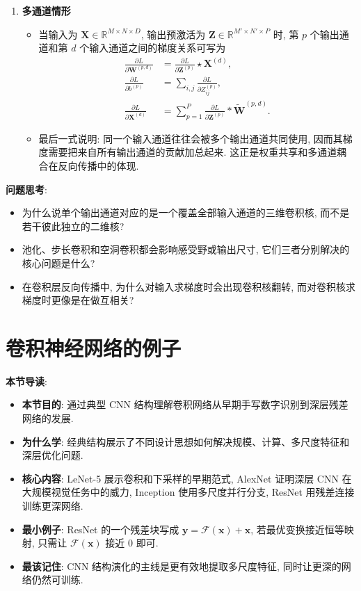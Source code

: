 \documentclass{../nndlcourse}
\begin{document}
\begin{enumerate}
    \item \textbf{多通道情形}
    \begin{itemize}
        \item 当输入为 $\boldsymbol{X} \in \mathbb{R}^{M \times N \times D}$, 输出预激活为 $\boldsymbol{Z} \in \mathbb{R}^{M' \times N' \times P}$ 时, 第 $p$ 个输出通道和第 $d$ 个输入通道之间的梯度关系可写为
        \begin{align*}
            \frac{\partial L}{\partial \boldsymbol{W}^{(p,d)}} &= \frac{\partial L}{\partial \boldsymbol{Z}^{(p)}} \star \boldsymbol{X}^{(d)}, \\
            \frac{\partial L}{\partial b^{(p)}} &= \sum_{i,j} \frac{\partial L}{\partial Z_{ij}^{(p)}}, \\
            \frac{\partial L}{\partial \boldsymbol{X}^{(d)}} &= \sum_{p=1}^{P} \frac{\partial L}{\partial \boldsymbol{Z}^{(p)}} * \tilde{\boldsymbol{W}}^{(p,d)}.
        \end{align*}
        \item 最后一式说明: 同一个输入通道往往会被多个输出通道共同使用, 因而其梯度需要把来自所有输出通道的贡献加总起来. 这正是权重共享和多通道耦合在反向传播中的体现.
    \end{itemize}
\end{enumerate}

\textbf{问题思考}:
\begin{itemize}
    \item 为什么说单个输出通道对应的是一个覆盖全部输入通道的三维卷积核, 而不是若干彼此独立的二维核?
    \item 池化、步长卷积和空洞卷积都会影响感受野或输出尺寸, 它们三者分别解决的核心问题是什么?
    \item 在卷积层反向传播中, 为什么对输入求梯度时会出现卷积核翻转, 而对卷积核求梯度时更像是在做互相关?
\end{itemize}
\section{卷积神经网络的例子}
\textbf{本节导读}:
\begin{itemize}
    \item \textbf{本节目的}: 通过典型 CNN 结构理解卷积网络从早期手写数字识别到深层残差网络的发展.
    \item \textbf{为什么学}: 经典结构展示了不同设计思想如何解决规模、计算、多尺度特征和深层优化问题.
    \item \textbf{核心内容}: LeNet-5 展示卷积和下采样的早期范式, AlexNet 证明深层 CNN 在大规模视觉任务中的威力, Inception 使用多尺度并行分支, ResNet 用残差连接训练更深网络.
    \item \textbf{最小例子}: ResNet 的一个残差块写成 $\boldsymbol{y}=\mathcal{F}(\boldsymbol{x})+\boldsymbol{x}$, 若最优变换接近恒等映射, 只需让 $\mathcal{F}(\boldsymbol{x})$ 接近 0 即可.
    \item \textbf{最该记住}: CNN 结构演化的主线是更有效地提取多尺度特征, 同时让更深的网络仍然可训练.
\end{itemize}
\end{document}
